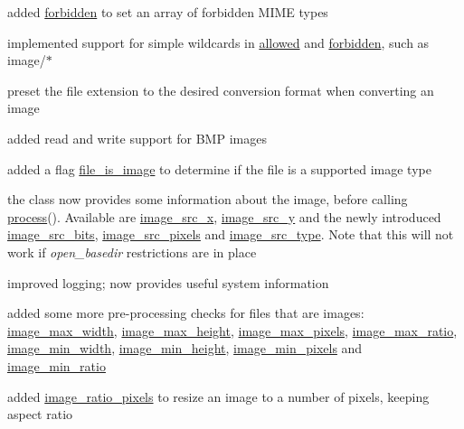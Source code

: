 \begin{DoxyItemize}
\begin{DoxyItemize}
\item added \hyperlink{}{forbidden} to set an array of forbidden M\+I\+M\+E types~\newline

\item implemented support for simple wildcards in \hyperlink{}{allowed} and \hyperlink{}{forbidden}, such as image/$\ast$~\newline

\item preset the file extension to the desired conversion format when converting an image~\newline

\item added read and write support for B\+M\+P images~\newline

\item added a flag \hyperlink{}{file\+\_\+is\+\_\+image} to determine if the file is a supported image type~\newline

\item the class now provides some information about the image, before calling \hyperlink{}{process}(). Available are \hyperlink{}{image\+\_\+src\+\_\+x}, \hyperlink{}{image\+\_\+src\+\_\+y} and the newly introduced \hyperlink{}{image\+\_\+src\+\_\+bits}, \hyperlink{}{image\+\_\+src\+\_\+pixels} and \hyperlink{}{image\+\_\+src\+\_\+type}. Note that this will not work if {\itshape open\+\_\+basedir} restrictions are in place~\newline

\item improved logging; now provides useful system information~\newline

\item added some more pre-\/processing checks for files that are images\+: \hyperlink{}{image\+\_\+max\+\_\+width}, \hyperlink{}{image\+\_\+max\+\_\+height}, \hyperlink{}{image\+\_\+max\+\_\+pixels}, \hyperlink{}{image\+\_\+max\+\_\+ratio}, \hyperlink{}{image\+\_\+min\+\_\+width}, \hyperlink{}{image\+\_\+min\+\_\+height}, \hyperlink{}{image\+\_\+min\+\_\+pixels} and \hyperlink{}{image\+\_\+min\+\_\+ratio}~\newline

\item added \hyperlink{}{image\+\_\+ratio\+\_\+pixels} to resize an image to a number of pixels, keeping aspect ratio~\newline


\end{DoxyItemize}
\end{DoxyItemize}
